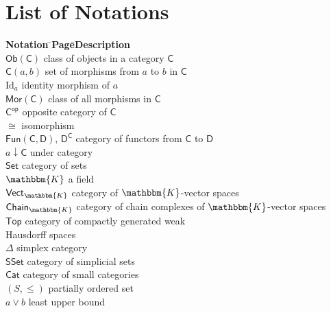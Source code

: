 \documentclass{amsbook}
\numberwithin{section}{chapter}
\numberwithin{subsection}{section}
\numberwithin{equation}{section}
\theoremstyle{plain}
\theoremstyle{definition}
\newcommand{\fieldk}{\mathbbm{K}}
\newcommand{\op}{\mathsf{op}}
\newcommand{\C}{\mathsf{C}}
\newcommand{\Cop}{\C^{\op}}
\newcommand{\D}{\mathsf{D}}
\newcommand{\Id}{\mathrm{Id}}
\newcommand{\Mor}{\mathsf{Mor}}
\newcommand{\Ob}{\mathsf{Ob}}
\newcommand{\Obc}{\Ob(\C)}
\newcommand{\Cat}{\mathsf{Cat}}
\newcommand{\Chaink}{\mathsf{Chain}_{\fieldk}}
\newcommand{\Fun}{\mathsf{Fun}}
\newcommand{\Set}{\mathsf{Set}}
\newcommand{\Sset}{\mathsf{SSet}}
\newcommand{\Top}{\mathsf{Top}}
\newcommand{\Vectk}{\mathsf{Vect}_{\fieldk}}
\begin{document}
\chapter*{List of Notations}

\newcommand{\where}[1]{\> \> \pageref{#1} \> \>}
\newcommand{\blob}{\> \> \> \> \hspace{2em}}

\begin{tabbing}
\textbf{Notation} \= \hspace{1.5cm}\= \textbf{Page}\= \hspace{.5cm}\=\textbf{Description} \\
$\Obc$ \where{notation:objects-category} class of objects in a category $\C$\\
$\C(a,b)$ \where{notation:morphism-set}  set of morphisms from $a$ to $b$ in $\C$\\
$\Id_a$ \where{notation:identity-morphism} identity morphism of $a$\\
$\Mor(\C)$ \where{notation:morphism-C} class of all morphisms in $\C$\\
$\Cop$ \where{notation:opposite-category} opposite category of $\C$\\
$\cong$ \where{notation:iso} isomorphism\\
$\Fun(\C,\D)$, $\D^{\C}$ \where{ex:functor-cat} category of functors from $\C$ to $\D$\\
$a \downarrow \C$ \where{ex:undercat} under category\\
$\Set$ \where{ex:set} category of sets\\
$\fieldk$ \where{notation:fieldk} a field\\
$\Vectk$ \where{ex:vectk} category of $\fieldk$-vector spaces\\
$\Chaink$ \where{ex:chaink} category of chain complexes of $\fieldk$-vector spaces\\
$\Top$ \where{ex:top} category of compactly generated weak\\
\blob Hausdorff spaces\\
$\Delta$ \where{ex:simplex-cat} simplex category\\ 
$\Sset$ \where{ex:simplicial-cat} category of simplicial sets\\
$\Cat$ \where{ex:cat} category of small categories\\
$(S,\leq)$ \where{ex:lattice} partially ordered set\\
$a \vee b$ \where{notation:lub} least upper bound\\

\end{tabbing}
\end{document}
